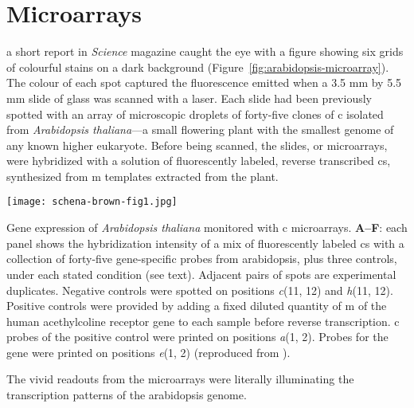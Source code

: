 \section{Microarrays}

 a short report in \emph{Science} magazine caught
the eye with a figure showing six grids of colourful stains on a dark background
(Figure~\ref{fig:arabidopsis-microarray}).  The colour of each spot %
captured the fluorescence emitted when a 3.5 mm by
5.5 mm slide of glass was scanned with a laser.  Each slide had been previously
spotted with an array of microscopic droplets of \mbox{forty-five} clones of
c isolated from \emph{Arabidopsis thaliana}---a small flowering
plant with the smallest genome of any known higher eukaryote.  Before being
scanned, the slides, or microarrays, were hybridized with a solution of
fluorescently labeled, reverse transcribed cs, synthesized from
m templates extracted from the plant.

\begin{marginfigure}%
  \texttt{[image: schena-brown-fig1.jpg]}
  \caption[Gene expression of \emph{Arabidopsis thaliana} monitored with
  c microarrays]{Gene expression of \emph{Arabidopsis thaliana}
    monitored with c microarrays. \textbf{A--F}: each panel shows
    the hybridization intensity of a mix of fluorescently labeled
    cs with a collection of \mbox{forty-five}
    \mbox{gene-specific} probes from arabidopsis, plus three controls, under
    each stated condition (see text).  Adjacent pairs of spots are experimental
    duplicates.  Negative controls were spotted on positions \emph{c}(11, 12)
    and \emph{h}(11, 12).  Positive controls were provided by adding a fixed
    diluted quantity of m of the human acethylcoline receptor
    gene to each sample before reverse transcription.  c probes
    of the positive control were printed on positions \emph{a}(1, 2). Probes for
    the \emph{} gene were printed on positions \emph{e}(1, 2)
    (reproduced from \citealp{schena_quantitative_1995}).}
  \label{fig:arabidopsis-microarray}
\end{marginfigure}

The vivid readouts from the microarrays were literally illuminating the
transcription patterns of the arabidopsis genome.

\bigskip

